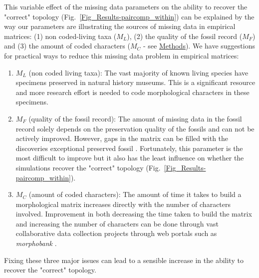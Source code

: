 \documentclass[12pt,letterpaper]{article}
\begin{document}
This variable effect of the missing data parameters on the ability to recover the "correct" topology (Fig.~\ref{Fig_Results-paircomp_within}) can be explained by the way our parameters are illustrating the sources of missing data in empirical matrices: (1) non coded-living  taxa ($M_{L}$), (2) the quality of the fossil record ($M_{F}$) and (3) the amount of coded characters ($M_{C}$ - see \hyperref[Removing_data]{Methods}). We have suggestions for practical ways to reduce this missing data problem in empirical matrices:
\begin{enumerate}
\item{$M_{L}$ (non coded living taxa):}
The vast majority of known living species have specimens preserved in natural history museums. This is a significant resource and more research effort is needed to code morphological characters in these specimens.
\item{$M_{F}$ (quality of the fossil record):}
The amount of missing data in the fossil record solely depends on the preservation quality of the fossils and can not be actively improved. However, gaps in the matrix can be filled with the discoveries exceptional preserved fossil \citep[e.g.][]{nithe2013}. Fortunately, this parameter is the most difficult to improve but it also has the least influence on whether the simulations recover the "correct" topology (Fig.~\ref{Fig_Results-paircomp_within}).
\item{$M_{C}$ (amount of coded characters):}
The amount of time it takes to build a morphological matrix increases directly with the number of characters involved. Improvement in both decreasing the time taken to build the matrix and increasing the number of characters can be done through vast collaborative data collection projects through web portals such as \textit{morphobank} \citep{morphobank}.
\end{enumerate}
Fixing these three major issues can lead to a sensible increase in the ability to recover the "correct" topology.

\end{document}
